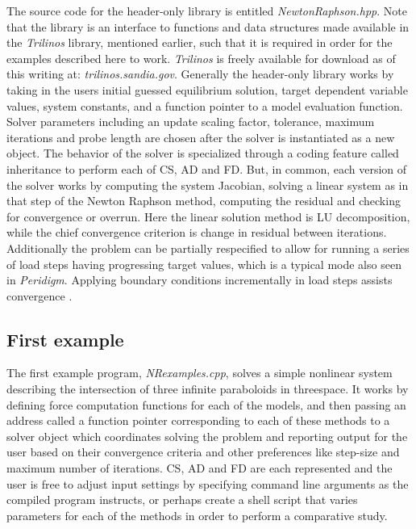 \documentclass[preprint,12pt]{elsarticle}
\begin{document}
The source code for the header-only library is entitled
\emph{NewtonRaphson.hpp}. Note that the library is an interface to functions and
data structures made available in the \emph{Trilinos} library, mentioned
earlier, such that it is required in order for the examples described here
to work. \emph{Trilinos} is freely available for download as of this
writing at: \emph{trilinos.sandia.gov}.  Generally the header-only library
works by taking in the users initial guessed equilibrium solution, target
dependent variable values, system constants, and a function pointer to a
model evaluation function. Solver parameters including an update scaling
factor, tolerance, maximum iterations and probe length are chosen after the
solver is instantiated as a new object. The behavior of the solver is
specialized through a coding feature called inheritance to perform each of
CS, AD and FD.  But, in common, each version of the solver works by
computing the system Jacobian, solving a linear system as in that step of
the Newton Raphson method, computing the residual and checking for
convergence or overrun. Here the linear solution method is LU
decomposition, while the chief convergence criterion is change in residual
between iterations.  Additionally the problem can be partially respecified
to allow for running a series of load steps having progressing target
values, which is a typical mode also seen in \emph{Peridigm}. Applying
boundary conditions incrementally in load steps assists convergence
\cite{rezaiee2010dynamic}.

\subsection{First example}
\label{subsec:ProgOne}
The first example program, \emph{NRexamples.cpp}, solves a simple nonlinear
system describing the intersection of three infinite paraboloids in threespace.
It works by defining force computation functions for each of the models, and
then passing an address called a function pointer corresponding to each of
these methods to a solver object which coordinates solving the problem and
reporting output for the user based on their convergence criteria and other
preferences like step-size and maximum number of iterations. CS, AD and FD are
each represented and the user is free to adjust input settings by specifying
command line arguments as the compiled program instructs, or perhaps create a
shell script that varies parameters for each of the methods in order to perform
a comparative study.
\end{document}
